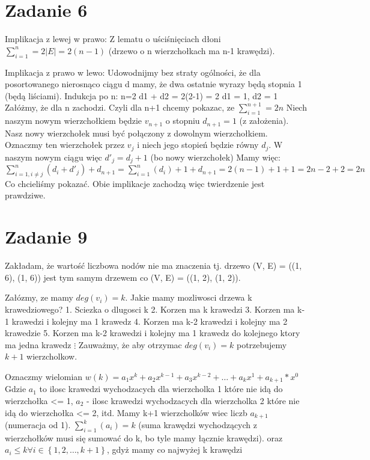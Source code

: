 \documentclass[12pt]{article}
\newcommand{\set}[1]{\left \{ #1 \right \}}				%
\begin{document}
\section{Zadanie 6}
Implikacja z lewej w prawo:
Z lematu o uściśnięciach dłoni $\sum_{i=1}^{n} = 2|E| = 2(n-1)$ (drzewo o n wierzchołkach ma n-1 krawędzi).

Implikacja z prawo w lewo:
Udowodnijmy bez straty ogólności, że dla posortowanego nierosnąco ciągu d mamy, że dwa ostatnie wyrazy będą stopnia 1 (będą liściami). 
Indukcja po n:
n=2
d1 + d2 = 2(2-1) = 2
d1 = 1, d2 = 1 
Załóżmy, że dla n zachodzi. Czyli dla n+1 chcemy pokazac, ze $\sum_{i=1}^{n+1} = 2n$
Niech naszym nowym wierzchołkiem będzie $v_{n+1}$ o stopniu $d_{n+1} = 1$ (z założenia). Nasz nowy wierzchołek musi być połączony z dowolnym wierzchołkiem. Oznaczmy ten wierzchołek przez $v_j$ i niech jego stopień będzie równy $d_j$.
W naszym nowym ciągu więc $d'_j = d_j+1$ (bo nowy wierzchołek)
Mamy więc:
$\sum_{i=1, i \neq j}^{n} (d_i + d'_j) + d_{n+1} = \sum_{i=1}^n (d_i) + 1 + d_{n+1} = 2(n-1) + 1 + 1 = 2n - 2 + 2 = 2n$
Co chcieliśmy pokazać.
Obie implikacje zachodzą więc twierdzenie jest prawdziwe.



\section{Zadanie 9}
Zakładam, że wartość liczbowa nodów nie ma znaczenia tj. drzewo (V, E) = ((1, 6), (1, 6)) jest tym samym drzewem co (V, E) = ((1, 2), (1, 2)). 

Załózmy, ze mamy $deg(v_i) = k$. Jakie mamy mozliwosci drzewa k krawedziowego?
1. Sciezka o dlugosci k 
2. Korzen ma k krawedzi 
3. Korzen ma k-1 krawedzi i kolejny ma 1 krawedz 
4. Korzen ma k-2 krawedzi i kolejny ma 2 krawedzie 
5. Korzen ma k-2 krawedzi i kolejny ma 1 krawedz do kolejnego ktory ma jedna krawedz 
$\vdots$
Zauważmy, że aby otrzymac $deg(v_i) = k$ potrzebujemy $k+1$ wierzcholkow.

Oznaczmy wielomian 
$w(k) = a_1x^k + a_2x^{k-1} + a_3x^{k-2} + \dots + a_{k}x^1 + a_{k+1}*x^0$
Gdzie $a_1$ to ilosc krawedzi wychodzacych dla wierzcholka 1 które nie idą do wierzchołka <= 1, $a_2$ - ilosc krawedzi wychodzacych dla wierzcholka 2 które nie idą do wierzchołka <= 2, itd.
Mamy k+1 wierzcholków wiec liczb $a_{k+1}$ (numeracja od 1).
$\sum_{i=1}^k (a_i) = k$ (suma krawędzi wychodzących z wierzchołków musi się sumować do k, bo tyle mamy łącznie krawędzi).
oraz 
$a_i \leq k \forall i \in \set{1, 2, \dots, k+1}$, gdyż mamy co najwyżej k krawędzi 
\end{document}
